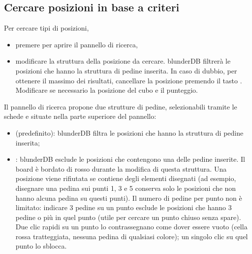 \documentclass[letterpaper,10pt,italian]{sphinxmanual}
\begin{document}
\subsection{Cercare posizioni in base a criteri}
\label{\detokenize{guide_utilisateur:rechercher-des-positions-selon-des-criteres}}
\sphinxAtStartPar
Per cercare tipi di posizioni,
\begin{itemize}
\item {} 
\sphinxAtStartPar
premere  per aprire il pannello di ricerca,

\item {} 
\sphinxAtStartPar
modificare la struttura della posizione da cercare. blunderDB filtrerà le posizioni che hanno  la struttura di pedine inserita. In caso di dubbio, per ottenere il massimo dei risultati, cancellare la posizione premendo il tasto . Modificare se necessario la posizione del cubo e il punteggio.

\end{itemize}

\sphinxAtStartPar
Il pannello di ricerca propone due strutture di pedine, selezionabili tramite le schede  e  situate nella parte superiore del pannello:
\begin{itemize}
\item {} 
\sphinxAtStartPar
{} (predefinito): blunderDB filtra le posizioni che hanno  la struttura di pedine inserita;

\item {} 
\sphinxAtStartPar
{}: blunderDB esclude le posizioni che contengono una delle pedine inserite. Il board è bordato di rosso durante la modifica di questa struttura. Una posizione viene rifiutata se contiene  degli elementi disegnati (ad esempio, disegnare una pedina sui punti 1, 3 e 5 conserva solo le posizioni che non hanno alcuna pedina su questi punti). Il numero di pedine per punto non è limitato: indicare 3 pedine su un punto esclude le posizioni che hanno 3 pedine o più in quel punto (utile per cercare un punto chiuso senza spare). Due clic rapidi su un punto lo contrassegnano come dover essere vuoto (cella rossa tratteggiata, nessuna pedina di qualsiasi colore); un singolo clic su quel punto lo sblocca.

\end{itemize}
\end{document}
